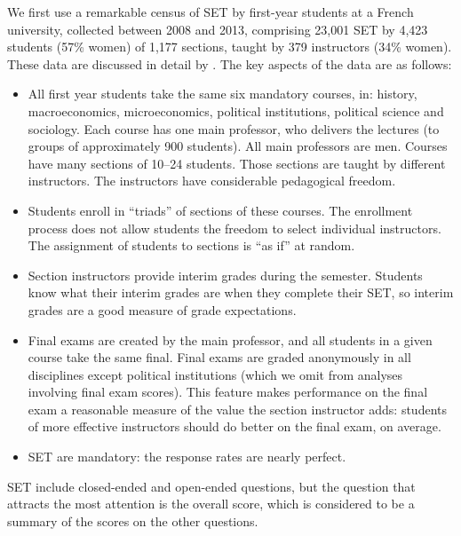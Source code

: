\documentclass[12pt]{article}
\begin{document}
We first use a remarkable census of SET by first-year students at a French university, 
collected between 2008 and 2013, comprising 23,001 SET by
4,423 students (57\% women) of 1,177
sections, taught by 379 instructors (34\% women). These data are discussed in detail by \citet{Boring2015}.
The key aspects of the data are as follows:
\begin{itemize}
   \item All first year students take the same six mandatory courses, in: history, macroeconomics, microeconomics, 
            political institutions, political science and sociology.
            Each course has one main professor,
            who delivers the lectures (to groups of approximately 900 students). All main professors are men.
            Courses have many sections of 10--24 students. 
            Those sections are taught by different instructors.
            The instructors have considerable pedagogical freedom.
    
   \item Students enroll in ``triads'' of sections of these courses. 
            The enrollment process
            does not allow students the freedom to select individual instructors.
            The assignment of students to sections is ``as if'' at random.
            
   \item Section instructors provide interim grades during the semester. 
            Students know what their interim grades are when they complete their SET, so interim grades are a 
            good measure of grade expectations.
            
   \item Final exams are created by the main professor, and all students in a given course take the
            same final. Final exams are graded anonymously in all disciplines except political
            institutions (which we omit from analyses involving final exam scores).
            This feature makes performance on the final exam a reasonable measure of the value the
            section instructor adds: students of more effective instructors should do better on
            the final exam, on average.
    
   \item SET are mandatory: the response rates are nearly perfect.
   
\end{itemize}

SET include closed-ended and open-ended questions, 
but the question that attracts the most attention is the overall
score, which is considered to be a summary 
of the scores on the other questions. 
\end{document}
